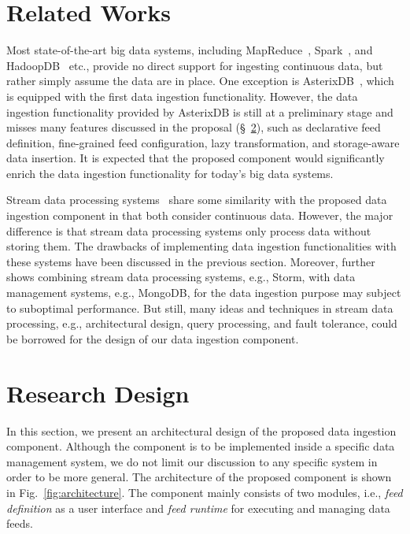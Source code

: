 \documentclass[conference]{llncs}
\newcommand{\reffigure}[1]{Fig.~\ref{#1}}
\newcommand{\refsection}[1]{\S~\ref{#1}}
\begin{document}
\section{Related Works}
\label{sec:related-works}
Most state-of-the-art big data systems, including MapReduce~\cite{mapreduce2008}, Spark~\cite{spark2012}, and HadoopDB~\cite{hadoopdb2009} etc., provide no direct support for ingesting continuous data, but rather simply assume the data are in place.
One exception is AsterixDB~\cite{ingestion2015}, which is equipped with the first data ingestion functionality.
However, the data ingestion functionality provided by AsterixDB is still at a preliminary stage and misses many features discussed in the proposal (\refsection{sec:research-design}), such as declarative feed definition, fine-grained feed configuration, lazy transformation, and storage-aware data insertion.
It is expected that the proposed component would significantly enrich the data ingestion functionality for today's big data systems.

Stream data processing systems~\cite{spade2008,s42010,spark-stream2012} share some similarity with the proposed data ingestion component in that both consider continuous data. However, the major difference is that stream data processing systems only process data without storing them. The drawbacks of implementing data ingestion functionalities with these systems have been discussed in the previous section.
Moreover, \cite{ingestion2015} further shows combining stream data processing systems, e.g., Storm, with data management systems, e.g., MongoDB, for the data ingestion purpose may subject to suboptimal performance.
But still, many ideas and techniques in stream data processing, e.g., architectural design, query processing, and fault tolerance, could be borrowed for the design of our data ingestion component.

\section{Research Design}
\label{sec:research-design}
In this section, we present an architectural design of the proposed data ingestion component.
Although the component is to be implemented inside a specific data management system, we do not limit our discussion to any specific system in order to be more general.
The architecture of the proposed component is shown in \reffigure{fig:architecture}.
The component mainly consists of two modules, i.e., \emph{feed definition} as a user interface and \emph{feed runtime} for executing and managing data feeds.
\end{document}
